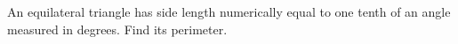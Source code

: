 An equilateral triangle has side length numerically equal to one tenth of an angle measured in degrees. Find its perimeter.
